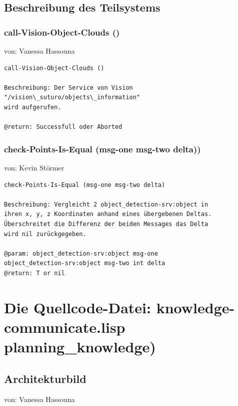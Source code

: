 \documentclass{suturo}
\makeatletter
\newcommand{\chapterauthor}[1]{%
  {\parindent0pt\vspace*{-27pt}%
  \linespread{0}\small\begin{flushright}von: #1\end{flushright}%
  \par\nobreak\vspace*{0pt}}
  \@afterheading%
}
\makeatother
\begin{document}
\subsection{Beschreibung des Teilsystems}




\subsubsection{call-Vision-Object-Clouds ()}
\chapterauthor{Vanessa Hassouna}
\begin{verbatim}
call-Vision-Object-Clouds ()

Beschreibung: Der Service von Vision "/vision\_suturo/objects\_information"
wird aufgerufen.

@return: Successfull oder Aborted
\end{verbatim}

\subsubsection{check-Points-Is-Equal (msg-one msg-two delta))}
\chapterauthor{Kevin Störmer}
\begin{verbatim}
check-Points-Is-Equal (msg-one msg-two delta)

Beschreibung: Vergleicht 2 object_detection-srv:object in
ihren x, y, z Koordinaten anhand eines übergebenen Deltas.
Überschreitet die Differenz der beiden Messages das Delta
wird nil zurückgegeben.

@param: object_detection-srv:object msg-one 
object_detection-srv:object msg-two int delta
@return: T or nil
\end{verbatim}

\section{Die Quellcode-Datei: knowledge-communicate.lisp\\
planning\_knowledge)}

\subsection{Architekturbild}
\chapterauthor{Vanessa Hassouna}
\end{document}
